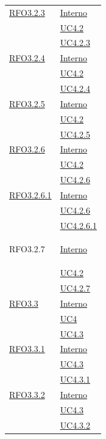 \begin{longtable}{|>{\centering}m{5cm}|m{5cm}<{\centering}|}
\hyperlink{RFO3.2.3}{RFO3.2.3} & \hyperlink{Interno}{Interno}\\
& \hyperref[UC4.2]{UC4.2}\\
& \hyperref[UC4.2.3]{UC4.2.3}\\ \hline

\hyperlink{RFO3.2.4}{RFO3.2.4} & \hyperlink{Interno}{Interno}\\
& \hyperref[UC4.2]{UC4.2}\\
& \hyperref[UC4.2.4]{UC4.2.4}\\ \hline

\hyperlink{RFO3.2.5}{RFO3.2.5} & \hyperlink{Interno}{Interno}\\
& \hyperref[UC4.2]{UC4.2}\\
& \hyperref[UC4.2.5]{UC4.2.5}\\ \hline

\hyperlink{RFO3.2.6}{RFO3.2.6} & \hyperlink{Interno}{Interno}\\
& \hyperref[UC4.2]{UC4.2}\\
& \hyperref[UC4.2.6]{UC4.2.6}\\ \hline

\hyperlink{RFO3.2.6.1}{RFO3.2.6.1} & \hyperlink{Interno}{Interno}\\
& \hyperref[UC4.2.6]{UC4.2.6}\\
& \hyperref[UC4.2.6.1]{UC4.2.6.1}\\ \hline

\hypertarget{RFO3.2.7}{RFO3.2.7} &\hyperlink{Interno}{Interno}\\
&\hyperref[UC4.2]{UC4.2}\\
&\hyperref[UC4.2.7]{UC4.2.7}\\ \hline

\hyperlink{RFO3.3}{RFO3.3} & \hyperlink{Interno}{Interno}\\
& \hyperref[UC4]{UC4}\\
& \hyperref[UC4.3]{UC4.3}\\ \hline

\hyperlink{RFO3.3.1}{RFO3.3.1} & \hyperlink{Interno}{Interno}\\
& \hyperref[UC4.3]{UC4.3}\\
& \hyperref[UC4.3.1]{UC4.3.1}\\ \hline

\hyperlink{RFO3.3.2}{RFO3.3.2} & \hyperlink{Interno}{Interno}\\
& \hyperref[UC4.3]{UC4.3}\\
& \hyperref[UC4.3.2]{UC4.3.2}\\ \hline


\end{longtable}
